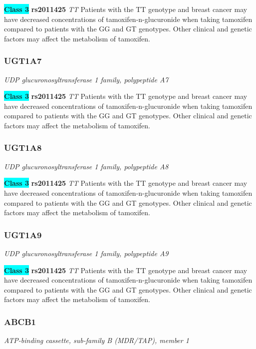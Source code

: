 \documentclass{report}
\begin{document}
\textbf{\colorbox{cyan} {Class 3}} \textbf{ rs2011425 } \textit{ TT }
Patients with the TT genotype and breast cancer may have decreased concentrations of tamoxifen-n-glucuronide when taking tamoxifen compared to patients with the GG and GT genotypes. Other clinical and genetic factors may affect the metabolism of tamoxifen.\newline\subsubsection{ UGT1A7 }
\textit{ UDP glucuronosyltransferase 1 family, polypeptide A7 }

\textbf{\colorbox{cyan} {Class 3}} \textbf{ rs2011425 } \textit{ TT }
Patients with the TT genotype and breast cancer may have decreased concentrations of tamoxifen-n-glucuronide when taking tamoxifen compared to patients with the GG and GT genotypes. Other clinical and genetic factors may affect the metabolism of tamoxifen.\newline\subsubsection{ UGT1A8 }
\textit{ UDP glucuronosyltransferase 1 family, polypeptide A8 }

\textbf{\colorbox{cyan} {Class 3}} \textbf{ rs2011425 } \textit{ TT }
Patients with the TT genotype and breast cancer may have decreased concentrations of tamoxifen-n-glucuronide when taking tamoxifen compared to patients with the GG and GT genotypes. Other clinical and genetic factors may affect the metabolism of tamoxifen.\newline\subsubsection{ UGT1A9 }
\textit{ UDP glucuronosyltransferase 1 family, polypeptide A9 }

\textbf{\colorbox{cyan} {Class 3}} \textbf{ rs2011425 } \textit{ TT }
Patients with the TT genotype and breast cancer may have decreased concentrations of tamoxifen-n-glucuronide when taking tamoxifen compared to patients with the GG and GT genotypes. Other clinical and genetic factors may affect the metabolism of tamoxifen.\newline\subsubsection{ ABCB1 }
\textit{ ATP-binding cassette, sub-family B (MDR/TAP), member 1 }
\end{document}
